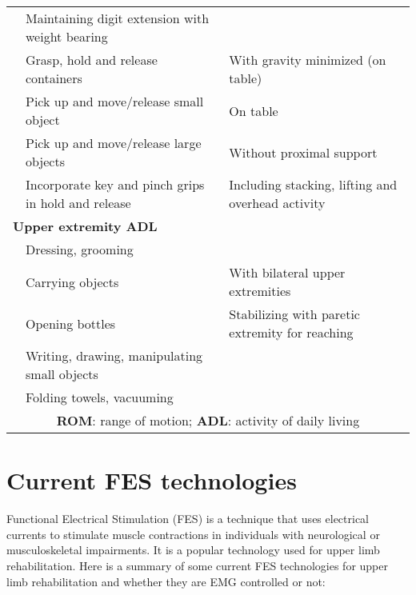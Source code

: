 \begin{table}[htbp]
\begin{tabular}{p{2.5cm}p{5cm}p{7cm}}
     & Maintaining digit extension with weight bearing & \\
     & Grasp, hold and release containers & With gravity minimized (on table) \\
     & Pick up and move/release small object & On table \\
     & Pick up and move/release large objects & Without proximal support \\
     & Incorporate key and pinch grips in hold and release & Including stacking, lifting and overhead activity \\
    \multicolumn{3}{l}{\textbf{Upper extremity ADL}} \\
     & Dressing, grooming & \\
     & Carrying objects & With bilateral upper extremities \\
     & Opening bottles & Stabilizing with paretic extremity for reaching \\
     & Writing, drawing, manipulating small objects & \\
     & Folding towels, vacuuming\\
     \bottomrule
     \multicolumn{3}{c}{ \textbf{ROM}: range of motion; \textbf{ADL}: activity of daily living}
    \end{tabular}
    \label{BankofExercises}
\end{table}

\section{Current FES technologies}
Functional Electrical Stimulation (FES) is a technique that uses electrical currents to stimulate muscle contractions in individuals with neurological or musculoskeletal impairments. It is a popular technology used for upper limb rehabilitation. Here is a summary of some current FES technologies for upper limb rehabilitation and whether they are EMG controlled or not:

